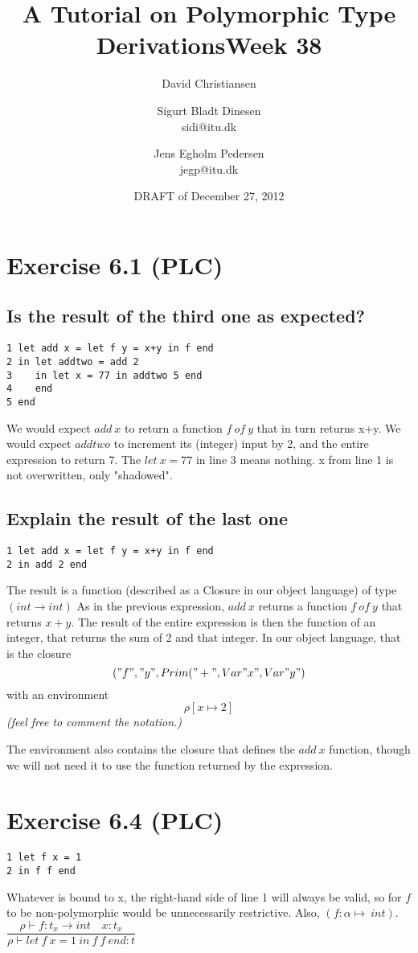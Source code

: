 \documentclass[a4paper]{article}
\title{A Tutorial on Polymorphic Type Derivations}
\author{David Christiansen}
\date{DRAFT of December 27, 2012}
\begin{document}
\title{Week 38}
\author{Sigurt Bladt Dinesen \\sidi{@}itu.dk \and Jens Egholm Pedersen \\jegp{@}itu.dk}
\maketitle
\section*{Exercise 6.1 (PLC)}
\subsection*{Is the result of the third one as expected?}
\begin{verbatim}
1 let add x = let f y = x+y in f end
2 in let addtwo = add 2
3    in let x = 77 in addtwo 5 end
4    end
5 end
\end{verbatim}
We would expect $add\ x$ to return a function $f\ of\ y$ that in turn returns x+y.
We would expect $addtwo$ to increment its (integer) input by 2, and the entire expression
to return 7.
The $let\ x = 77$ in line 3 means nothing. x from line 1 is not overwritten, only "shadowed".

\subsection*{Explain the result of the last one}
\begin{verbatim}
1 let add x = let f y = x+y in f end
2 in add 2 end
\end{verbatim}
The result is a function (described as a Closure in our object language) of
type $(int \to int)$ As in the previous expression, $add\ x$ returns a function
$f\ of\ y$ that returns $x+y$. The result of the entire expression is then the
function of an integer, that returns the sum of 2 and that integer.
In our object language, that is the closure
$$("f","y", Prim("+", Var "x", Var "y")$$
with an environment $$\rho [x \mapsto 2]$$
\textit{\small{(feel free to comment the notation.)}}

The environment also contains the closure that defines the $add\ x$ function,
though we will not need it to use the function returned by the expression.

\section*{Exercise 6.4 (PLC)}
\begin{verbatim}
1 let f x = 1
2 in f f end
\end{verbatim}
Whatever is bound to x, the right-hand side of line 1 will always be valid, so
for $f$ to be non-polymorphic would be unnecessarily restrictive.
Also, $(f : \alpha \mapsto \ int)$.
\\

$\dfrac{\rho \vdash f : t_x \rightarrow int \quad x : t_x}{\rho \vdash let\ f\ x = 1\ in\ f\ f\ end : t}$
\end{document}
